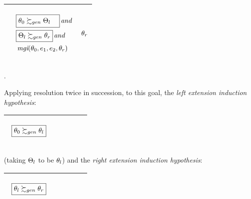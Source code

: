 \documentclass[runningheads]{llncs}
\DeclareMathOperator{\uand}{\emph{and}\,}
\DeclareMathOperator{\mgi}{\emph{mgi}}
\begin{document}
\begin{center}
\begin{tabular}{|m{}|m{}||m{}|}
 \hline 
  & 
   \begin{center}
{$\begin{aligned}
 & \boxed{\begin{aligned}
    &\thet{0} \moregen  \Thet{l}
    \end{aligned}} \uand \\
 &\boxed{\Thet{l} \moregen \thet{r}}  \uand  \\
  & \,{\mgi}(\thet{0}, \e{1}, \e{2}, \thet{r})
\end{aligned}$}
\end{center}
& 
\begin{center}

$ \begin{aligned}
   \theta_{r}
 \end{aligned}    
$
\end{center}
\\
\hline
\end{tabular}.
\end{center}
Applying resolution twice in succession, to this goal,  the \emph{left extension induction hypothesis}:
  \begin{center}
  \begin{tabular}{|m{}|m{}||m{}|}
\hline
\begin{center}
{$\begin{aligned}
 &\begin{aligned}
 &\begin{aligned}
 \,\, &\, \boxed{\theta_{0} \succsim_{gen} \theta_{l}} 
\end{aligned}
\end{aligned}\end{aligned}   $} 
\end{center}& &  \\  \hline
\end{tabular}
\end{center}
(taking $\Theta_{l}$ to be $\theta_{l}$) and the \emph{right extension induction hypothesis}:
\begin{center}
  \begin{tabular}{|m{}|m{}||m{}|}
\hline
\begin{center}
{$
\begin{aligned}
&\begin{aligned}
&\begin{aligned}
 \,\, &\, \boxed{\theta_{l} \succsim_{gen} \theta_{r}} 
\end{aligned}
\end{aligned}
\end{aligned} $}  \hspace{0cm} 
\end{center}& &  \\  \hline
\end{tabular}
\end{center}
\end{document}
